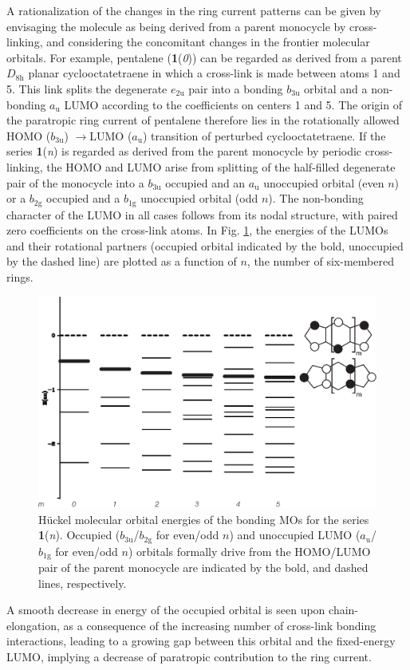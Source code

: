 A rationalization of the changes in the ring current patterns can be given by envisaging the molecule as being derived from a parent monocycle by cross-linking, and considering the concomitant changes in the frontier molecular orbitals. For example, pentalene (\textbf{1}(\textit{0})) can be regarded as derived from a parent $D_\mathrm{8h}$ planar cyclooctatetraene in which a cross-link is made between atoms 1 and 5. This link splits the degenerate $e_\mathrm{2u}$ pair into a bonding $b_\mathrm{3u}$ orbital and a non-bonding $a_\mathrm{u}$ LUMO according to the coefficients on centers 1 and 5. The origin of the paratropic ring current of pentalene therefore lies in the rotationally allowed HOMO ($b_\mathrm{3u}$) $\rightarrow$LUMO ($a_\mathrm{u}$) transition   \cite{r05,r35,r36} of perturbed cyclooctatetraene. If the series \textbf{1}(\textit{n}) is regarded as derived from the parent monocycle by periodic cross-linking, the HOMO and LUMO arise from splitting of the half-filled degenerate pair of the monocycle into a $b_\mathrm{3u}$ occupied and an $a_\mathrm{u}$ unoccupied orbital (even $n$) or a $b_\mathrm{2g}$ occupied and a $b_\mathrm{1g}$ unoccupied orbital (odd $n$). The non-bonding character of the LUMO in all cases follows from its nodal structure, with paired zero coefficients on the cross-link atoms. In Fig. \ref{ch7.fig05}, the energies of the LUMOs and their rotational partners (occupied orbital indicated by the bold, unoccupied by the dashed line) are plotted as a function of $n$, the number of six-membered rings.
\begin{figure}
\center
\includegraphics[width=5.5in]{indacene/figures/figure5.eps}
\caption{H\"uckel molecular orbital energies of the bonding MOs for the series \textbf{1}(\textit{n}). Occupied ($b_\mathrm{3u}$/$b_\mathrm{2g}$ for even/odd $n$) and unoccupied LUMO ($a_\mathrm{u}$/$b_\mathrm{1g}$ for even/odd $n$) orbitals formally drive from the HOMO/LUMO pair of the parent monocycle are indicated by the bold, and dashed lines, respectively.}
\label{ch7.fig05}
\end{figure}
A smooth decrease in energy of the occupied orbital is seen upon chain-elongation, as a consequence of the increasing number of cross-link bonding interactions, leading to a growing gap between this orbital and the fixed-energy LUMO, implying a decrease of paratropic contribution to the ring current.

